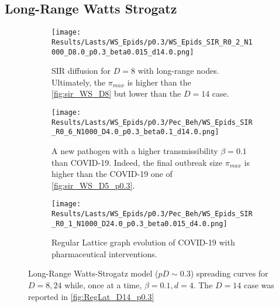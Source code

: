 \documentclass[a4paper,10pt,twoside]{book} %
\theoremstyle{definition}
\begin{document}
\subsection{Long-Range Watts Strogatz}
\begin{figure}[htbp]
    \centering
	\begin{subfigure}[t]{\textwidth}
        \centering
        \texttt{[image: Results/Lasts/WS\_Epids/p0.3/WS\_Epids\_SIR\_R0\_2\_N1000\_D8.0\_p0.3\_beta0.015\_d14.0.png]} 
        \caption{SIR diffusion for $ D = 8$ with long-range nodes. Ultimately, the $ \pi_{max} $ is higher than the \autoref{fig:sir_WS_D8} but lower than the $ D = 14$ case.} 
		\label{fig:sir_WS_D5_p0.3}
    \end{subfigure}
	\vfill
	\begin{subfigure}[t]{\textwidth}
        \centering
        \texttt{[image: Results/Lasts/WS\_Epids/p0.3/Pec\_Beh/WS\_Epids\_SIR\_R0\_6\_N1000\_D4.0\_p0.3\_beta0.1\_d14.0.png]}
        \caption{A new pathogen with a higher transmissibility $ \beta = 0.1$ than COVID-19. Indeed, the final outbreak size $\pi_{max} $ is higher than the COVID-19 one of \autoref{fig:sir_WS_D5_p0.3}.} 
		\label{fig:sir_WS_D4_b0.1_p0.3}
    \end{subfigure}
	\vfill
    \begin{subfigure}[t]{\textwidth}
        \centering
        \texttt{[image: Results/Lasts/WS\_Epids/p0.3/Pec\_Beh/WS\_Epids\_SIR\_R0\_1\_N1000\_D24.0\_p0.3\_beta0.015\_d4.0.png]} 
        \caption{Regular Lattice graph evolution of COVID-19 with pharmaceutical interventions.} 
		\label{fig:sir_WS_D24_d4_p0.3}
    \end{subfigure}
    \caption{Long-Range Watts-Strogatz model ($ p D \sim 0.3 $) spreading curves for $D = 8, 24$ while, once at a time, $ \beta = 0.1, d = 4$. The $ D = 14$ case was reported in \autoref{fig:RegLat_D14_p0.3}}
	\label{fig:sir_WS_D5D5b0.1_D24d4_p0.3}
\end{figure}

\clearpage
\end{document}
